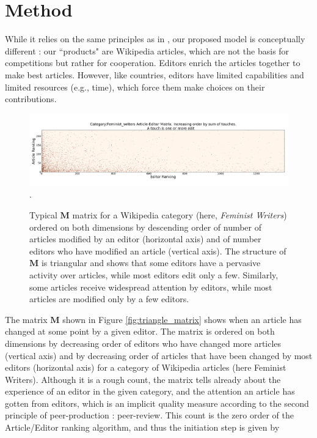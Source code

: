\section{Method}
While it relies on the same principles as in \cite{caldarelli2012network}, our proposed model is conceptually different : our ``products" are Wikipedia articles, which are not the basis for competitions but rather for cooperation. Editors enrich the articles together to make best articles. However, like countries, editors have limited capabilities and limited resources (e.g., time), which force them make choices on their contributions.

\begin{figure}[!t]
\centering
\includegraphics[width=2.0\columnwidth]{Figures/Category_Feminist_writerstriangle_matrix_corrected.png}.
\caption{Typical $\mathbf{M}$ matrix for a Wikipedia category (here, {\it Feminist Writers}) ordered on both dimensions by descending order of number of articles modified by an editor (horizontal axis) and of number editors who have modified an article (vertical axis). The structure of $\mathbf{M}$ is triangular and shows that some editors have a pervasive activity over articles, while most editors edit only a few. Similarly, some articles receive widespread attention by editors, while most articles are modified only by a few editors.}
\label{fig:triangle}
\end{figure}


The matrix $\mathbf{M}$ shown in Figure \ref{fig:triangle_matrix} shows when an article has changed at some point by a given editor. The matrix is ordered on both dimensions by decreasing order of editors who have changed more articles (vertical axis) and by decreasing order of articles that have been changed by most editors (horizontal axis) for a category of Wikipedia articles (here Feminist Writers). Although it is a rough count, the matrix tells already about the experience of an editor in the given category, and the attention an article has gotten from editors, which is an implicit quality measure according to the second principle of peer-production : peer-review. This count is the zero order of the Article/Editor ranking algorithm, and thus the initiation step is given by 

